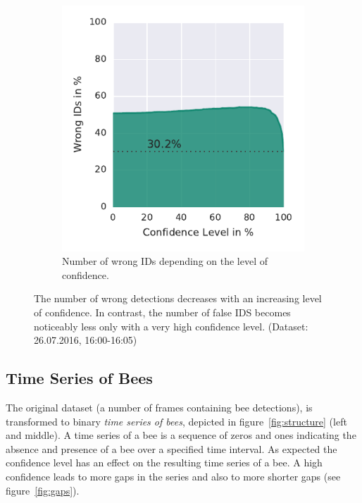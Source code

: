 \begin{figure}
\begin{subfigure}[b]{0.45\textwidth}
		\includegraphics[width=\textwidth]{Figures/confVSidsquality}
		\caption[Unique IDs]{Number of wrong IDs depending on the level of confidence.}
		\label{fig:confVSidsquality}
	\end{subfigure}
	\caption[Data Quality]{The number of wrong detections decreases with an increasing level of confidence. In contrast, the number of false IDS becomes noticeably less only with a very high confidence level. (Dataset: 26.07.2016, 16:00-16:05)}
	\label{fig:quality}
\end{figure}


\subsection{Time Series of Bees}
\label{subsec:tracking}

The original dataset (a number of frames containing bee detections), is transformed to binary \emph{time series of bees}, depicted in figure~\ref{fig:structure} (left and middle). A time series of a bee is a sequence of zeros and ones indicating the absence and presence of a bee over a specified time interval. 
As expected the confidence level has an effect on the resulting time series of a bee. A high confidence leads to more gaps in the series and also to more shorter gaps (see figure~\ref{fig:gaps}).

